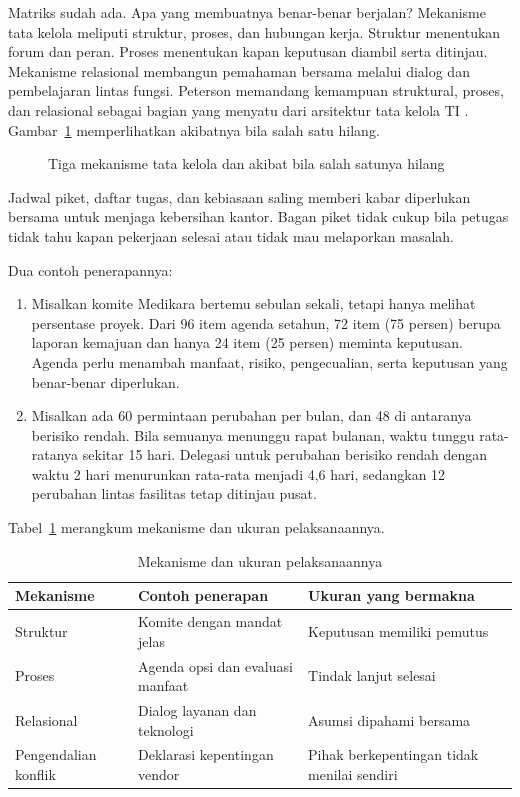 Matriks sudah ada. Apa yang membuatnya benar-benar berjalan? Mekanisme tata kelola meliputi
struktur, proses, dan hubungan kerja. Struktur menentukan forum dan peran. Proses menentukan
kapan keputusan diambil serta ditinjau. Mekanisme relasional membangun pemahaman bersama
melalui dialog dan pembelajaran lintas fungsi. Peterson memandang kemampuan struktural,
proses, dan relasional sebagai bagian yang menyatu dari arsitektur tata kelola TI
\cite{c02-peterson2004,dehaes2020}. Gambar~\ref{fig:ch02-mekanisme} memperlihatkan akibatnya
bila salah satu hilang.

\begin{figure}[!htb]
  \centering
  
  \caption{Tiga mekanisme tata kelola dan akibat bila salah satunya hilang}
  \label{fig:ch02-mekanisme}
\end{figure}

Jadwal piket, daftar tugas, dan kebiasaan saling memberi kabar diperlukan bersama untuk
menjaga kebersihan kantor. Bagan piket tidak cukup bila petugas tidak tahu kapan pekerjaan
selesai atau tidak mau melaporkan masalah.

Dua contoh penerapannya:
\begin{enumerate}
  \item Misalkan komite Medikara bertemu sebulan sekali, tetapi hanya melihat persentase
  proyek. Dari 96 item agenda setahun, 72 item (75 persen) berupa laporan kemajuan dan hanya
  24 item (25 persen) meminta keputusan. Agenda perlu menambah manfaat, risiko, pengecualian,
  serta keputusan yang benar-benar diperlukan.
  \item Misalkan ada 60 permintaan perubahan per bulan, dan 48 di antaranya berisiko rendah.
  Bila semuanya menunggu rapat bulanan, waktu tunggu rata-ratanya sekitar 15 hari. Delegasi
  untuk perubahan berisiko rendah dengan waktu 2 hari menurunkan rata-rata menjadi 4,6 hari,
  sedangkan 12 perubahan lintas fasilitas tetap ditinjau pusat.
\end{enumerate}

Tabel~\ref{tab:ch02-mekanisme} merangkum mekanisme dan ukuran pelaksanaannya.
\begin{table}[!htb]
  \centering\small
  \caption{Mekanisme dan ukuran pelaksanaannya}\label{tab:ch02-mekanisme}
  \begin{tabularx}{\textwidth}{|>{\raggedright\arraybackslash}p{}|>{\raggedright\arraybackslash}X|>{\raggedright\arraybackslash}X|}
    \hline
    \textbf{Mekanisme} & \textbf{Contoh penerapan} & \textbf{Ukuran yang bermakna} \\ \hline
    Struktur & Komite dengan mandat jelas & Keputusan memiliki pemutus \\ \hline
    Proses & Agenda opsi dan evaluasi manfaat & Tindak lanjut selesai \\ \hline
    Relasional & Dialog layanan dan teknologi & Asumsi dipahami bersama \\ \hline
    Pengendalian konflik & Deklarasi kepentingan vendor & Pihak berkepentingan tidak menilai
    sendiri \\ \hline
  \end{tabularx}
\end{table}

